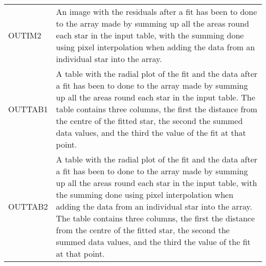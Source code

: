 {{\begin{tabular}{|l|p{4.5in}|}
    OUTIM2      &   An image with the residuals after a fit has been to
                   done to the array made by summing up all the areas 
                   round each star in the input table, with the 
                   summing done using pixel interpolation when adding 
                   the data from an individual star into the array. \\

    OUTTAB1      &  A table with the radial plot of the fit and the data
                   after a fit has been to done to the array made by 
                   summing up all the areas round each star in the 
                   input table. The table contains three columns, the 
                   first the distance from the centre of the fitted 
                   star, the second the summed data values, and the 
                   third the value of the fit at that point. \\

    OUTTAB2      &  A table with the radial plot of the fit and the data
                   after a fit has been to done to the array made by 
                   summing up all the areas round each star in the 
                   input table, with the summing done using pixel 
                   interpolation when adding the data from an 
                   individual star into the array. The table contains 
                   three columns, the first the distance from the 
                   centre of the fitted star, the second the summed 
                   data values, and the third the value of the fit at 
                   that point. \\ \hline
\end{tabular}

                                                                               
}}
